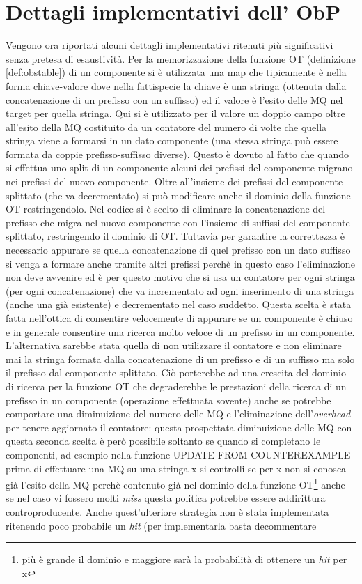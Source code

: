 \section[Dett. impl. ObP]{Dettagli implementativi dell' ObP}
\label{sec:implobp} 
Vengono ora riportati alcuni dettagli implementativi ritenuti più significativi senza pretesa di esaustività.
Per la memorizzazione della funzione OT (definizione \ref{def:obstable}) di un componente si è utilizzata una map che tipicamente è nella forma chiave-valore dove nella fattispecie la chiave è una stringa (ottenuta dalla concatenazione di un prefisso con un suffisso) ed il valore è l'esito delle \ac{MQ} nel target per quella stringa. Qui si è utilizzato per il valore un doppio campo oltre all'esito della \ac{MQ} costituito da un contatore del numero di volte che quella stringa viene a formarsi in un dato componente (una stessa stringa può essere formata da  coppie prefisso-suffisso diverse). Questo è dovuto al fatto che quando si effettua uno split di un componente alcuni dei prefissi del componente migrano nei prefissi del nuovo componente. Oltre all'insieme dei prefissi del componente splittato (che va decrementato) si può modificare anche il dominio della funzione OT restringendolo. Nel codice si è scelto di eliminare la concatenazione del prefisso che migra nel nuovo componente con l'insieme di suffissi del componente splittato, restringendo il dominio di OT. Tuttavia per garantire la correttezza è necessario appurare se quella concatenazione di quel prefisso con un dato suffisso si venga a formare anche tramite altri prefissi perchè in questo caso l'eliminazione non deve avvenire ed è per questo motivo che si usa un contatore per ogni stringa (per ogni concatenazione) che va incrementato ad ogni inserimento di una stringa (anche una già esistente) e decrementato nel caso suddetto.  Questa scelta è stata fatta nell'ottica di consentire velocemente di appurare se un componente è chiuso e in generale consentire una ricerca molto veloce di un prefisso in un componente. L'alternativa sarebbe stata quella di non utilizzare il contatore e non eliminare mai la stringa formata dalla concatenazione di un prefisso e di un suffisso ma solo il prefisso dal componente splittato. Ciò porterebbe ad una crescita del dominio di ricerca per la funzione OT che degraderebbe le prestazioni della ricerca di un prefisso in un componente (operazione effettuata sovente) anche se potrebbe  comportare una diminuizione del numero delle \ac{MQ} e l'eliminazione dell'\textit{overhead} per tenere aggiornato il contatore: questa prospettata diminuizione delle \ac{MQ} con questa seconda scelta è però possibile soltanto se quando si completano le componenti, ad esempio nella funzione UPDATE-FROM-COUNTEREXAMPLE  prima di effettuare una \ac{MQ} su una stringa x si controlli se per x non si conosca già l'esito della \ac{MQ} perchè contenuto già nel dominio della funzione OT\footnote{più è grande il dominio e maggiore sarà la probabilità di ottenere un \textit{hit} per x} anche se nel caso vi fossero molti \textit{miss} questa politica potrebbe essere addirittura controproducente. Anche quest'ulteriore strategia non è stata implementata ritenendo poco probabile un \textit{hit} (per implementarla basta decommentare 